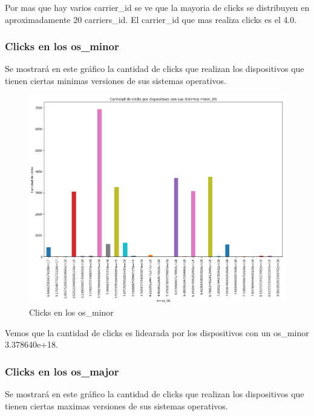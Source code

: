 \documentclass[a4paper, 12pt]{article}
\newcommand\tab[1][1cm]{\hspace*{#1}}
\begin{document}
		\tab Por mas que hay varios carrier\_id se ve que la mayoria de clicks se distribuyen en aproximadamente 20 carriers\_id. El carrier\_id que mas realiza clicks es el 4.0.

	\subsubsection{Clicks en los os\_minor}
		\tab Se mostrará en este gráfico la cantidad de clicks que realizan los dispositivos que tienen ciertas minimas versiones de sus sistemas operativos.

		\FloatBarrier
		\begin{figure}[h]
			\centering
			\includegraphics[width=\textwidth]{images/clicks/clicks_minor_OS.png}
			\caption{Clicks en los os\_minor}
		\end{figure}
		\FloatBarrier

		\tab Vemos que la cantidad de clicks es lidearada por los dispositivos con un os\_minor 3.378640e+18.

	\subsubsection{Clicks en los os\_major}
		\tab Se mostrará en este gráfico la cantidad de clicks que realizan los dispositivos que tienen ciertas maximas versiones de sus sistemas operativos.
\end{document}
